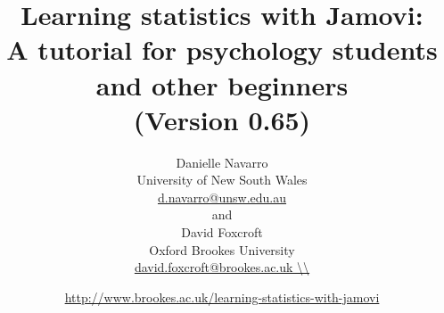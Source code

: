 

\date{\url{http://www.brookes.ac.uk/learning-statistics-with-jamovi} \hfill \\ }
\title{Learning statistics with Jamovi:\\ A tutorial for psychology students and other beginners \vspace*{12pt}
\\ (Version 0.65) \\ \vspace*{24pt}}
\author{Danielle Navarro \\ University of New South Wales \\ \url{d.navarro@unsw.edu.au} \vspace*{12pt} \\
and \vspace*{12pt} \\
David Foxcroft \\ Oxford Brookes University \\ \url{david.foxcroft@brookes.ac.uk \\} \vspace*{36pt}}


 
